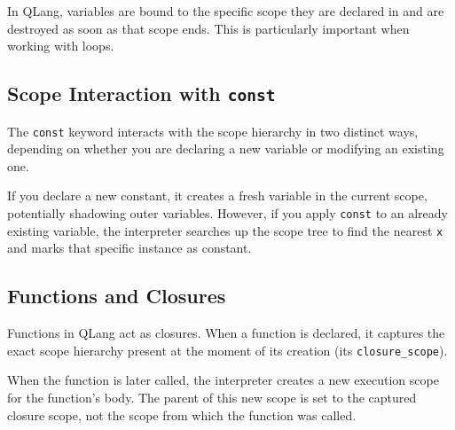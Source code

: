 In QLang, variables are bound to the specific scope they are declared in and are
destroyed as soon as that scope ends. This is particularly
important when working with loops.



\newpage
{}
\subsection{Scope Interaction with \texttt{const}}
\label{sec:const-scope}

The \texttt{const} keyword interacts with the scope hierarchy in two distinct
ways, depending on whether you are declaring a new variable or modifying an
existing one.

If you declare a new constant, it creates a fresh
variable in the current scope, potentially shadowing outer variables. 
However, if you apply \texttt{const} to an already existing variable, 
the interpreter searches up the scope tree to find the
nearest \texttt{x} and marks that specific instance as constant.


\subsection{Functions and Closures}
\label{sec:functions-and-closures}

Functions in QLang act as closures. When a function is declared, it captures
the exact scope hierarchy present at the moment of its creation (its
\texttt{closure\_scope}). 

When the function is later called, the interpreter creates a new execution scope
for the function's body. The parent of this new scope is set to the captured
closure scope, not the scope from which the function was called.
